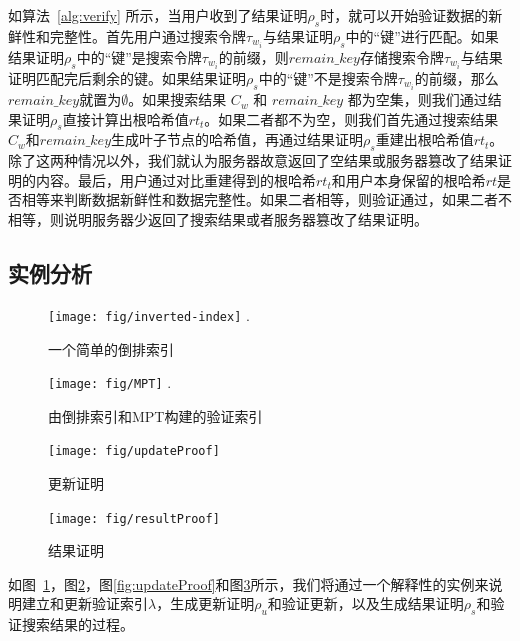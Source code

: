 如算法~\ref{alg:verify} 所示，当用户收到了结果证明$\rho_s$时，就可以开始验证数据的新鲜性和完整性。首先用户通过搜索令牌$\tau_{w_i}$与结果证明$\rho_s$中的“键”进行匹配。如果结果证明$\rho_s$中的“键”是搜索令牌$\tau_{w_i}$的前缀，则$remain\_key$存储搜索令牌$\tau_{w_i}$与结果证明匹配完后剩余的键。如果结果证明$\rho_s$中的“键”不是搜索令牌$\tau_{w_i}$的前缀，那么$remain\_key$就置为$\emptyset$。如果搜索结果 $C_{w}$ 和 $remain\_key$ 都为空集，则我们通过结果证明$\rho_s$直接计算出根哈希值$rt_t$。如果二者都不为空，则我们首先通过搜索结果$C_{w}$和$remain\_key$生成叶子节点的哈希值，再通过结果证明$\rho_s$重建出根哈希值$rt_t$。除了这两种情况以外，我们就认为服务器故意返回了空结果或服务器篡改了结果证明的内容。最后，用户通过对比重建得到的根哈希$rt_t$和用户本身保留的根哈希$rt$是否相等来判断数据新鲜性和数据完整性。如果二者相等，则验证通过，如果二者不相等，则说明服务器少返回了搜索结果或者服务器篡改了结果证明。



\subsection{实例分析}
\label{sec:example}

\begin{figure}[ht]
\centering
\texttt{[image: fig/inverted-index]}
\DeclareGraphicsExtensions.
\caption{一个简单的倒排索引}
\label{fig:inverted-index}
\end{figure}

\begin{figure}[ht]
\centering
\texttt{[image: fig/MPT]}
\DeclareGraphicsExtensions.
\caption{由倒排索引和MPT构建的验证索引}
\label{fig:MPT}
\end{figure}


\begin{figure}[ht]
  \begin{minipage}[b]{0.49\textwidth}
    \texttt{[image: fig/updateProof]}
    \caption{更新证明}
    \label{fig:updateProof}
  \end{minipage}
  \begin{minipage}[b]{0.49\textwidth}
    \texttt{[image: fig/resultProof]}
    \caption{结果证明}
    \label{fig:resultProof}
  \end{minipage}
\centering
\end{figure}

如图~\ref{fig:inverted-index}，图\ref{fig:MPT}，图\ref{fig:updateProof}和图\ref{fig:resultProof}所示，我们将通过一个解释性的实例来说明建立和更新验证索引$\lambda$，生成更新证明$\rho_u$和验证更新，以及生成结果证明$\rho_s$和验证搜索结果的过程。

